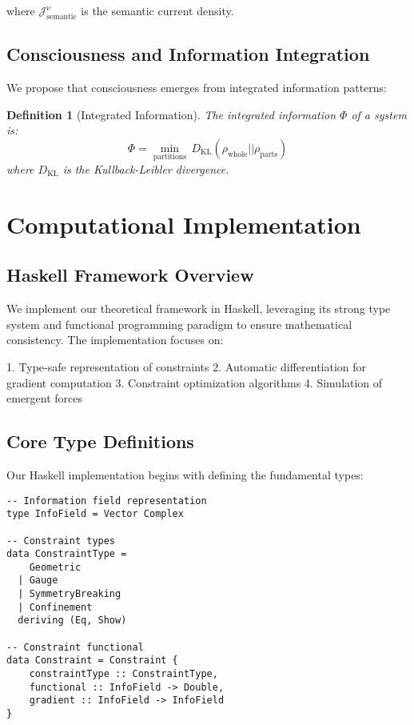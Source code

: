 \documentclass[11pt,a4paper]{article}
\newtheorem{definition}[theorem]{Definition}
\begin{document}
where $\mathcal{J}^{\nu}_{\text{semantic}}$ is the semantic current density.

\subsection{Consciousness and Information Integration}

We propose that consciousness emerges from integrated information patterns:

\begin{definition}[Integrated Information]
The integrated information $\Phi$ of a system is:
\begin{equation}
\Phi = \min_{\text{partitions}} \, D_{\text{KL}}(\rho_{\text{whole}} || \rho_{\text{parts}})
\end{equation}
where $D_{\text{KL}}$ is the Kullback-Leibler divergence.
\end{definition}

\section{Computational Implementation}

\subsection{Haskell Framework Overview}

We implement our theoretical framework in Haskell, leveraging its strong type system and functional programming paradigm to ensure mathematical consistency. The implementation focuses on:

1. Type-safe representation of constraints
2. Automatic differentiation for gradient computation
3. Constraint optimization algorithms
4. Simulation of emergent forces

\subsection{Core Type Definitions}

Our Haskell implementation begins with defining the fundamental types:

\begin{lstlisting}
-- Information field representation
type InfoField = Vector Complex

-- Constraint types
data ConstraintType = 
    Geometric 
  | Gauge 
  | SymmetryBreaking 
  | Confinement
  deriving (Eq, Show)

-- Constraint functional
data Constraint = Constraint {
    constraintType :: ConstraintType,
    functional :: InfoField -> Double,
    gradient :: InfoField -> InfoField
}
\end{lstlisting}
\end{document}

